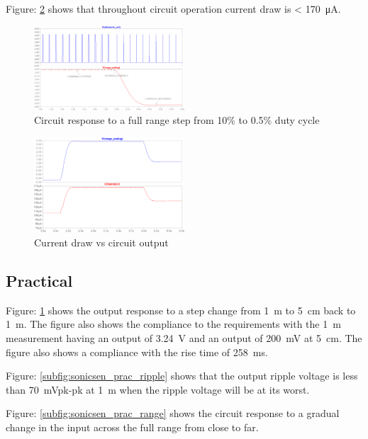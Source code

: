 Figure: \ref{fig:sonicsen_sim_cur} shows that throughout circuit operation current draw is < \SI{170}{\micro\ampere}.

\begin{figure}[H]
\centering
\includegraphics[width = 0.5\textwidth]{./Figures/SonicSens_RangeStep.png}
\caption{Circuit response to a full range step from 10\% to 0.5\% duty cycle}
\label{fig:sonicsen_sim_step}
\end{figure}

\begin{figure}[H]
\centering
\includegraphics[width = 0.5\textwidth]{./Figures/SonicSens_CurDraw.png}
\caption{Current draw vs circuit output}
\label{fig:sonicsen_sim_cur}
\end{figure}

\subsection{Practical}

Figure: \ref{fig:sonicsen_sim_step} shows the output response to a step change from \SI{1}{\meter} to \SI{5}{\centi\meter} back to \SI{1}{\meter}. The figure also shows the compliance to the requirements with the \SI{1}{\meter} measurement having an output of \SI{3.24}{\volt} and an output of \SI{200}{\milli\volt} at \SI{5}{\centi\meter}. The figure also shows a compliance with the rise time of \SI{258}{\milli\second}.

Figure: \ref{subfig:sonicsen_prac_ripple} shows that the output ripple voltage is less than \SI{70}{\milli\volt}pk-pk at \SI{1}{\meter} when the ripple voltage will be at its worst.

Figure: \ref{subfig:sonicsen_prac_range} shows the circuit response to a gradual change in the input across the full range from close to far.

